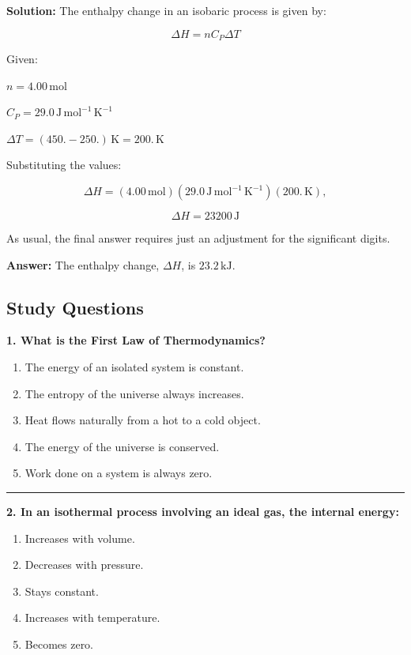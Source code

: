 \documentclass[
  9pt,
]{extbook}
\providecommand{\tightlist}{%
  \setlength{\itemsep}{0pt}\setlength{\parskip}{0pt}}
\theoremstyle{definition}
\theoremstyle{definition}
\theoremstyle{definition}
\theoremstyle{definition}
\theoremstyle{remark}
\begin{document}
\textbf{Solution:} The enthalpy change in an isobaric process is given by:

\[\Delta H = n C_P \Delta T\]

Given:

\(n = 4.00 \, \text{mol}\)

\(C_P = 29.0 \, \text{J} \, \text{mol}^{-1} \, \text{K}^{-1}\)

\(\Delta T = (450. - 250.) \, \text{K} = 200. \, \text{K}\)

Substituting the values:

\[\Delta H = (4.00\, \text{mol}) (29.0 \, \text{J} \, \text{mol}^{-1} \, \text{K}^{-1}) (200.\,\text{K}),\]

\[\Delta H = 23200 \, \text{J}\]

As usual, the final answer requires just an adjustment for the significant digits.

\textbf{Answer:} The enthalpy change, \(\Delta H\), is \(23.2 \, \text{kJ}\).

\subsection{Study Questions}\label{quest3}

\textbf{1. What is the First Law of Thermodynamics?}

\begin{enumerate}
\def\labelenumi{\alph{enumi}.}
\tightlist
\item
  The energy of an isolated system is constant.
\item
  The entropy of the universe always increases.
\item
  Heat flows naturally from a hot to a cold object.
\item
  The energy of the universe is conserved.
\item
  Work done on a system is always zero.
\end{enumerate}

\begin{center}\rule{0.5\linewidth}{0.5pt}\end{center}

\textbf{2. In an isothermal process involving an ideal gas, the internal energy:}

\begin{enumerate}
\def\labelenumi{\alph{enumi}.}
\tightlist
\item
  Increases with volume.
\item
  Decreases with pressure.
\item
  Stays constant.
\item
  Increases with temperature.
\item
  Becomes zero.
\end{enumerate}
\end{document}

